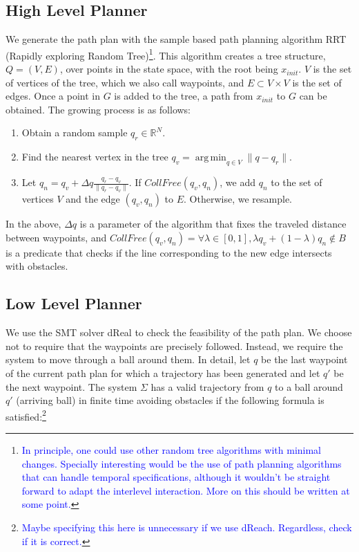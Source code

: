 \documentclass[12pt]{article}
\DeclareMathOperator*{\argmin}{arg\,min}
\newcommand\fran[1]{\textcolor{blue}{#1}}
\newcommand\ffran[1]{\textcolor{blue}{\footnote{\fran{#1}}}}
\begin{document}
\subsection{High Level Planner}
\label{sub:high_level_planner}

We generate the path plan with the sample based path planning algorithm RRT (Rapidly exploring Random Tree)\ffran{In principle, one could use other random tree algorithms with minimal changes. Specially interesting would be the use of path planning algorithms that can handle temporal specifications, although it wouldn't be straight forward to adapt the interlevel interaction. More on this should be written at some point.}. This algorithm creates a tree structure, $Q = (V, E)$, over points in the state space, with the root being $x_{init}$. $V$ is the set of vertices of the tree, which we also call waypoints, and $E \subset V \times V$ is the set of edges. Once a point in $G$ is added to the tree, a path from $x_{init}$ to $G$ can be obtained. The growing process is as follows:

\begin{enumerate}
    \item Obtain a random sample $q_r \in \mathbb{R}^N$.
    \item Find the nearest vertex in the tree $q_v = \argmin_{q \in V} \|q - q_r\|$.
    \item Let $q_n = q_v + \Delta q \frac{q_r - q_v}{\|q_r - q_v\|}$. If $CollFree(q_v, q_n)$, we add $q_n$ to the set of vertices $V$ and the edge $(q_v, q_n)$ to $E$. Otherwise, we resample.
\end{enumerate}

In the above, $\Delta q$ is a parameter of the algorithm that fixes the traveled distance between waypoints, and $CollFree(q_v, q_n) = \forall \lambda \in [0, 1], \lambda q_v + (1 - \lambda) q_n \notin B$ is a predicate that checks if the line corresponding to the new edge intersects with obstacles.

\subsection{Low Level Planner}
\label{sub:low_level_planner}

We use the SMT solver dReal to check the feasibility of the path plan. We choose not to require that the waypoints are precisely followed. Instead, we require the system to move through a ball around them. In detail, let $q$ be the last waypoint of the current path plan for which a trajectory has been generated and let $q'$ be the next waypoint. The system $\Sigma$ has a valid trajectory from $q$ to a ball around $q'$ (arriving ball) in finite time avoiding obstacles if the following formula is satisfied:\ffran{Maybe specifying this here is unnecessary if we use dReach. Regardless, check if it is correct.}
\end{document}
